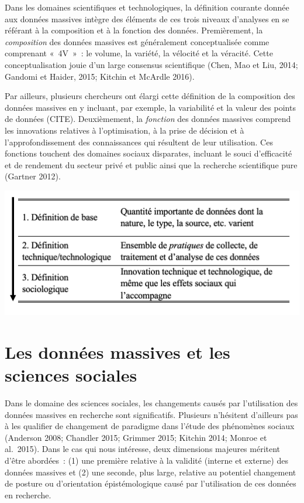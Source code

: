 \documentclass[
  letterpaper,
]{scrbook}
\begin{document}
Dans les domaines scientifiques et technologiques, la définition
courante donnée aux données massives intègre des éléments de ces trois
niveaux d'analyses en se référant à la composition et à la fonction des
données. Premièrement, la \emph{composition} des données massives est
généralement conceptualisée comme comprenant «~4V~»~: le volume, la
variété, la vélocité et la véracité. Cette conceptualisation jouie d'un
large consensus scientifique (Chen, Mao et Liu, 2014; Gandomi et Haider,
2015; Kitchin et McArdle 2016).

Par ailleurs, plusieurs chercheurs ont élargi cette définition de la
composition des données massives en y incluant, par exemple, la
variabilité et la valeur des points de données (CITE). Deuxièmement, la
\emph{fonction} des données massives comprend les innovations relatives
à l'optimisation, à la prise de décision et à l'approfondissement des
connaissances qui résultent de leur utilisation. Ces fonctions touchent
des domaines sociaux disparates, incluant le souci d'efficacité et de
rendement du secteur privé et public ainsi que la recherche scientifique
pure (Gartner 2012).

\includegraphics{images/Capture d’écran, le 2023-08-11 à 13.15.13.png}

\hypertarget{les-donnuxe9es-massives-et-les-sciences-sociales}{%
\section{Les données massives et les sciences
sociales}\label{les-donnuxe9es-massives-et-les-sciences-sociales}}

Dans le domaine des sciences sociales, les changements causés par
l'utilisation des données massives en recherche sont significatifs.
Plusieurs n'hésitent d'ailleurs pas à les qualifier de changement de
paradigme dans l'étude des phénomènes sociaux (Anderson 2008; Chandler
2015; Grimmer 2015; Kitchin 2014; Monroe et al.~2015). Dans le cas qui
nous intéresse, deux dimensions majeures méritent d'être abordées~: (1)
une première relative à la validité (interne et externe) des données
massives et (2) une seconde, plus large, relative au potentiel
changement de posture ou d'orientation épistémologique causé par
l'utilisation de ces données en recherche.
\end{document}
